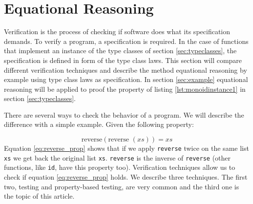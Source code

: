 \section{Equational Reasoning}
\label{sec:equationalreasoning}

Verification is the process of checking if software does what its specification demands. To verify a program, a specification is required. In the case of functions that implement an instance of the type classes of section \ref{sec:typeclasses}, the specification is defined in form of the type class laws.
This section will compare different verification techniques and describe the method equational reasoning by example using type class laws as specification. In section \ref{sec:example} equational reasoning will be applied to proof the property of listing \ref{lst:monoidinstance1} in section \ref{sec:typeclasses}.

There are several ways to check the behavior of a program. 
We will describe the difference with a simple example. Given the following property:

\begin{equation}
  \label{eq:reverse_prop}
\text{reverse} (\text{reverse } (xs)) = xs  
\end{equation}
Equation \ref{eq:reverse_prop} shows that if we apply \verb|reverse| twice on the same list \verb|xs| we get back the original list \verb|xs|. \verb|reverse| is the inverse of \verb|reverse| (other functions, like \verb|id|, have this property too). Verification techniques allow us to check if equation \ref{eq:reverse_prop} holds. We describe three techniques. The first two, testing and property-based testing, are very common and the third one is the topic of this article.

